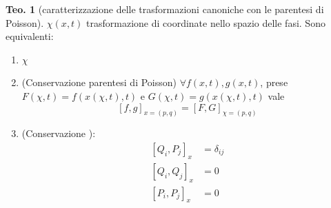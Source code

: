 \documentclass[a4paper,10pt]{article}
\theoremstyle{definition}
\theoremstyle{indentdefinition}
\theoremstyle{indenttheorem}
\newtheorem{thm}{Teo.}
\theoremstyle{myremark}
\theoremstyle{indentgeneral}
\newenvironment{myboxed} 
{\noindent\begin{lrbox}{\mybox}\begin{minipage}{\textwidth}}
{\end{minipage}\end{lrbox}\fbox{\usebox{\mybox}}}
\begin{document}
\begin{myboxed}
\begin{thm}[caratterizzazione delle trasformazioni canoniche con le parentesi
di Poisson]
$\chi\left(x,t\right)$ trasformazione di coordinate nello spazio
delle fasi. Sono equivalenti:
\begin{enumerate}
\item $\chi$ 
\item (Conservazione parentesi di Poisson) $\forall f\left(x,t\right),g\left(x,t\right)$, prese $F\left(\chi,t\right)=f\left(x\left(\chi,t\right),t\right)$
e $G\left(\chi,t\right)=g\left(x\left(\chi,t\right),t\right)$
vale $$\left[f,g\right]_{x=\left(p,q\right)}=\left[F,G\right]_{\chi=\left(p,q\right)}$$
\item (Conservazione ): 
\begin{align*}
    \left[Q_{i},P_{j}\right]_{x}&=\delta_{ij} \\
    \left[Q_{i},Q_{j}\right]_{x}&=0 \\
    \left[P_{i},P_{j}\right]_{x}&=0
\end{align*}
\end{enumerate}
\end{thm}
\end{myboxed}
\end{document}
